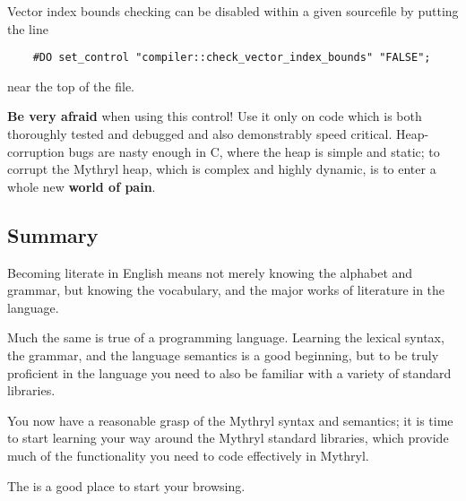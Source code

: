 Vector index bounds checking can be disabled 
within a given sourcefile by putting the line 

\begin{verbatim}
    #DO set_control "compiler::check_vector_index_bounds" "FALSE";
\end{verbatim}

near the top of the file.

\textbf{Be very afraid} when using this control!  Use it only 
on code which is both thoroughly tested and debugged and also demonstrably 
speed critical.  Heap-corruption bugs are nasty enough in C, where the heap 
is simple and static;  to corrupt the Mythryl heap, which is complex and 
highly dynamic, is to enter a whole new \textbf{world of pain}. 

\cutend*


\subsection{Summary}

Becoming literate in English means not merely knowing the alphabet and grammar, 
but knowing the vocabulary, and the major works of literature in the language.

Much the same is true of a programming language.  Learning the lexical syntax, 
the grammar, and the language semantics is a good beginning, but to be truly 
proficient in the language you need to also be familiar with a variety of 
standard libraries.

You now have a reasonable grasp of the Mythryl syntax and semantics;  it is 
time to start learning your way around the Mythryl standard libraries, which 
provide much of the functionality you need to code effectively in Mythryl. 

The  is a good place to start your browsing.

\cutend*

